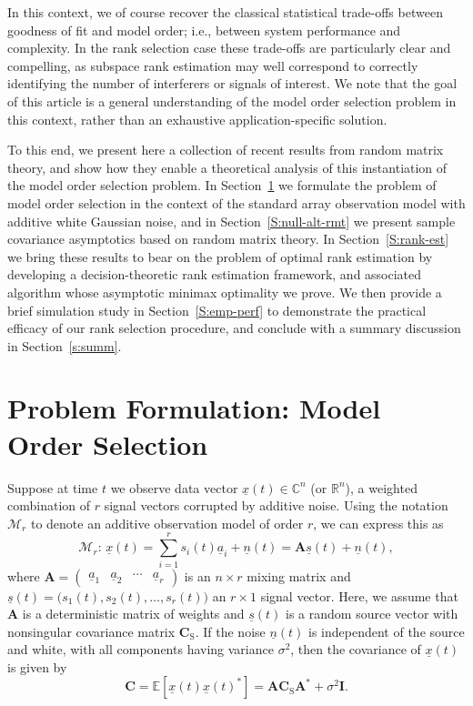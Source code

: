 \documentclass[final]{IEEEtran}
\newcommand{\vectorsymbol}{\underline}
\newcommand{\matrixsymbol}{\boldsymbol}
\newcommand{\mA}{\matrixsymbol{A}}
\newcommand{\mC}{\matrixsymbol{C}}
\newcommand{\mCs}{\matrixsymbol{C}_\text{S}}
\newcommand{\mI}{\matrixsymbol{I}}
\newcommand{\va}{\vectorsymbol{a}}
\newcommand{\vn}{\vectorsymbol{n}}
\newcommand{\vs}{\vectorsymbol{s}}
\newcommand{\vx}{\vectorsymbol{x}}
\newcommand{\reals}{\mathbb{R}}
\newcommand{\complexes}{\mathbb{C}}
\newcommand{\E}{\mathbb{E}}
\begin{document}
In this context, we of course recover the classical statistical trade-offs between goodness of fit and model order; i.e., between system performance and complexity.  In the rank selection case these trade-offs are particularly clear and compelling, as subspace rank estimation may well correspond to correctly identifying the number of interferers or signals of interest.  We note that the goal of this article is a general understanding of the model order selection problem in this context, rather than an exhaustive application-specific solution.

To this end, we present here a collection of recent results from random matrix theory, and show how they enable a theoretical analysis of this instantiation of the model order selection problem.  In Section~\ref{S:prob-state} we formulate the problem of model order selection  in the context of the standard array observation model with additive white Gaussian noise, and in Section~\ref{S:null-alt-rmt} we present sample covariance asymptotics based on random matrix theory.  In Section~\ref{S:rank-est} we bring these results to bear on the problem of optimal rank estimation by developing a decision-theoretic rank estimation framework, and associated algorithm whose asymptotic minimax optimality we prove.  We then provide a brief simulation study in Section~\ref{S:emp-perf} to demonstrate the practical efficacy of our rank selection procedure, and conclude with a summary discussion in Section~\ref{s:summ}.

\section{Problem Formulation: Model Order Selection}
\label{S:prob-state}

Suppose at time $t$ we observe data vector $\vx(t) \in \complexes^n$
(or $\reals^n$), a weighted combination of $r$ signal vectors corrupted
by additive noise.  Using the notation $\mathcal{M}_r$ to denote an additive observation model of order $r$, we can express this as
\begin{equation}\label{E:Signal}
    \mathcal{M}_r\!:\, \vx(t) = \sum_{i=1}^{r} s_{i}(t) \va_{i} + \vn(t) = \mA \vs(t) + \vn(t),
\end{equation}
where
\(
    \mA
    =
    \left(
    \begin{matrix}
        \va_{1} & \va_{2} & \cdots & \va_{r}
    \end{matrix}
    \right)
\)
is an $n \times r$ mixing matrix and
\(
    \vs(t)
    =
    \big(
        s_1(t), s_2(t), \ldots, s_r(t)
    \big)
\)
an $r \times 1$ signal vector.  Here, we assume that $\mA$ is a deterministic matrix of weights and
$\vs(t)$ is a random source vector with nonsingular covariance matrix $\mCs$.
If the noise $\vn(t)$ is independent of the source and white, with
all components having variance $\sigma^2$, then the covariance of $\vx(t)$ is
given by
\begin{equation}\label{E:C-decomp}
    \mC
    =
    \E\left[ \vx(t) \vx(t)^* \right]
    =
    \mA \mCs \mA^* + \sigma^2 \mI.
\end{equation}
\end{document}
